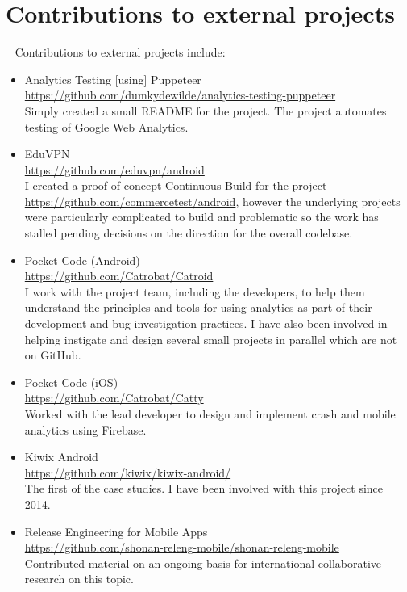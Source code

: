 \section{Contributions to external projects}~\label{sec:contributions-to-external-projects}
Contributions to external projects include:
\begin{itemize}
    \item Analytics Testing [using] Puppeteer\\ \url{https://github.com/dumkydewilde/analytics-testing-puppeteer}\\ Simply created a small README for the project. The project automates testing of Google Web Analytics.
    
    \item EduVPN\\
    \url{https://github.com/eduvpn/android}\\
    I created a proof-of-concept Continuous Build for the project \url{https://github.com/commercetest/android}, however the underlying projects were particularly complicated to build and problematic so the work has stalled pending decisions on the direction for the overall codebase.
    
    \item Pocket Code (Android)\\
    \url{https://github.com/Catrobat/Catroid}\\
    I work with the project team, including the developers, to help them understand the principles and tools for using analytics as part of their development and bug investigation practices. I have also been involved in helping instigate and design several small projects in parallel which are not on GitHub.
    
    \item Pocket Code (iOS)\\
    \url{https://github.com/Catrobat/Catty}\\
    Worked with the lead developer to design and implement crash and mobile analytics using Firebase.
    
    \item Kiwix Android\\
    \url{https://github.com/kiwix/kiwix-android/}\\
    The first of the case studies. I have been involved with this project since 2014.

    \item Release Engineering for Mobile Apps\\ \url{https://github.com/shonan-releng-mobile/shonan-releng-mobile}\\ Contributed material on an ongoing basis for international collaborative research on this topic. 
    

\end{itemize}
